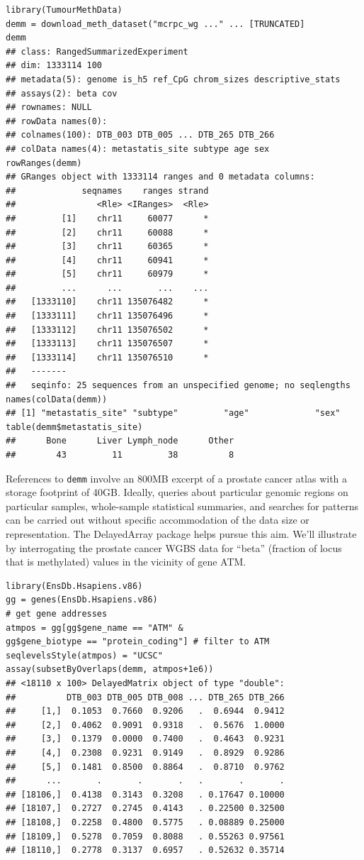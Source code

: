 \documentclass[graybox]{svmult}
\begin{document}
\begin{shaded}
\begin{verbatim}
library(TumourMethData)
demm = download_meth_dataset("mcrpc_wg ..." ... [TRUNCATED] 
demm
## class: RangedSummarizedExperiment 
## dim: 1333114 100 
## metadata(5): genome is_h5 ref_CpG chrom_sizes descriptive_stats
## assays(2): beta cov
## rownames: NULL
## rowData names(0):
## colnames(100): DTB_003 DTB_005 ... DTB_265 DTB_266
## colData names(4): metastatis_site subtype age sex
rowRanges(demm)
## GRanges object with 1333114 ranges and 0 metadata columns:
##             seqnames    ranges strand
##                <Rle> <IRanges>  <Rle>
##         [1]    chr11     60077      *
##         [2]    chr11     60088      *
##         [3]    chr11     60365      *
##         [4]    chr11     60941      *
##         [5]    chr11     60979      *
##         ...      ...       ...    ...
##   [1333110]    chr11 135076482      *
##   [1333111]    chr11 135076496      *
##   [1333112]    chr11 135076502      *
##   [1333113]    chr11 135076507      *
##   [1333114]    chr11 135076510      *
##   -------
##   seqinfo: 25 sequences from an unspecified genome; no seqlengths
names(colData(demm))
## [1] "metastatis_site" "subtype"         "age"             "sex"            
table(demm$metastatis_site)
##      Bone      Liver Lymph_node      Other 
##        43         11         38          8 
\end{verbatim}
\end{shaded}


References to \texttt{demm} involve an 800MB excerpt of a
prostate cancer atlas with a
storage footprint of 40GB.
Ideally,
queries about particular genomic
regions on particular samples, whole-sample statistical summaries,
and searches for patterns can be carried out without
specific accommodation of the data size or representation.
The DelayedArray package helps pursue this aim. We'll illustrate
by interrogating the prostate cancer WGBS data for ``beta''
(fraction of locus that is methylated) values in the vicinity of
gene ATM.

\begin{shaded}
\begin{verbatim}
library(EnsDb.Hsapiens.v86)
gg = genes(EnsDb.Hsapiens.v86)
# get gene addresses
atmpos = gg[gg$gene_name == "ATM" &
gg$gene_biotype == "protein_coding"] # filter to ATM
seqlevelsStyle(atmpos) = "UCSC"
assay(subsetByOverlaps(demm, atmpos+1e6))
## <18110 x 100> DelayedMatrix object of type "double":
##          DTB_003 DTB_005 DTB_008 ... DTB_265 DTB_266
##     [1,]  0.1053  0.7660  0.9206   .  0.6944  0.9412
##     [2,]  0.4062  0.9091  0.9318   .  0.5676  1.0000
##     [3,]  0.1379  0.0000  0.7400   .  0.4643  0.9231
##     [4,]  0.2308  0.9231  0.9149   .  0.8929  0.9286
##     [5,]  0.1481  0.8500  0.8864   .  0.8710  0.9762
##      ...       .       .       .   .       .       .
## [18106,]  0.4138  0.3143  0.3208   . 0.17647 0.10000
## [18107,]  0.2727  0.2745  0.4143   . 0.22500 0.32500
## [18108,]  0.2258  0.4800  0.5775   . 0.08889 0.25000
## [18109,]  0.5278  0.7059  0.8088   . 0.55263 0.97561
## [18110,]  0.2778  0.3137  0.6957   . 0.52632 0.35714
\end{verbatim}
\end{shaded}
\end{document}
